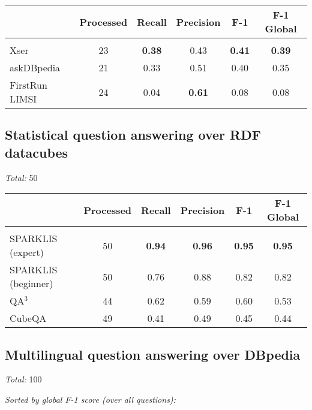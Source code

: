 \documentclass{article}
\begin{document}
\begin{tabular}{p{4cm}ccccc}
& Processed & Recall & Precision & F-1 & F-1 Global \\
\hline \\[1ex]
Xser           & 23 & \textbf{0.38} & 0.43 & \textbf{0.41} & \textbf{0.39} \\
askDBpedia     & 21 & 0.33 & 0.51 & 0.40 & 0.35 \\
FirstRun LIMSI & 24 & 0.04 & \textbf{0.61} & 0.08 & 0.08 \\
\end{tabular}

\vspace{1cm}

\subsection*{Statistical question answering over RDF datacubes}

\emph{Total:} 50

\vspace{.6cm}

\begin{tabular}{p{4cm}ccccc}
& Processed & Recall & Precision & F-1 & F-1 Global \\
\hline \\[1ex]
SPARKLIS (expert)   & 50 & \textbf{0.94} & \textbf{0.96} & \textbf{0.95} & \textbf{0.95} \\
SPARKLIS (beginner) & 50 & 0.76 & 0.88 & 0.82 & 0.82 \\
QA$^3$              & 44 & 0.62 & 0.59 & 0.60 & 0.53 \\
CubeQA              & 49 & 0.41 & 0.49 & 0.45 & 0.44 \\
\end{tabular}

\newpage

\subsection*{Multilingual question answering over DBpedia}

\emph{Total:} 100

\vspace{.6cm}

\emph{Sorted by global F-1 score (over all questions):}

\vspace{.6cm}
\end{document}
